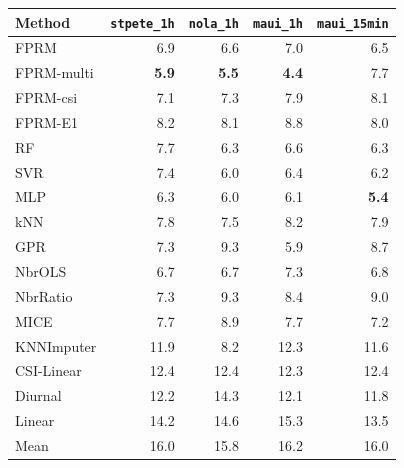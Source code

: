 \begin{tabular}{lrrrr}
\toprule
Method & \texttt{stpete\_1h} & \texttt{nola\_1h} & \texttt{maui\_1h} & \texttt{maui\_15min} \\
\midrule
FPRM & 6.9 & 6.6 & 7.0 & 6.5 \\
FPRM-multi & \textbf{5.9} & \textbf{5.5} & \textbf{4.4} & 7.7 \\
FPRM-csi & 7.1 & 7.3 & 7.9 & 8.1 \\
FPRM-E1 & 8.2 & 8.1 & 8.8 & 8.0 \\
\midrule
RF & 7.7 & 6.3 & 6.6 & 6.3 \\
SVR & 7.4 & 6.0 & 6.4 & 6.2 \\
MLP & 6.3 & 6.0 & 6.1 & \textbf{5.4} \\
kNN & 7.8 & 7.5 & 8.2 & 7.9 \\
GPR & 7.3 & 9.3 & 5.9 & 8.7 \\
\midrule
NbrOLS & 6.7 & 6.7 & 7.3 & 6.8 \\
NbrRatio & 7.3 & 9.3 & 8.4 & 9.0 \\
MICE & 7.7 & 8.9 & 7.7 & 7.2 \\
KNNImputer & 11.9 & 8.2 & 12.3 & 11.6 \\
\midrule
CSI-Linear & 12.4 & 12.4 & 12.3 & 12.4 \\
Diurnal & 12.2 & 14.3 & 12.1 & 11.8 \\
Linear & 14.2 & 14.6 & 15.3 & 13.5 \\
Mean & 16.0 & 15.8 & 16.2 & 16.0 \\
\bottomrule
\end{tabular}
